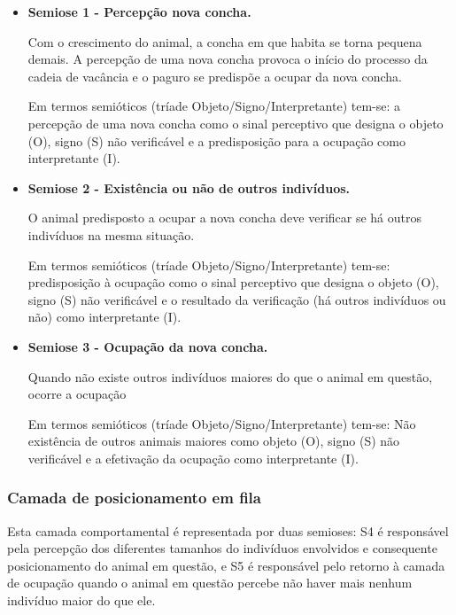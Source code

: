 \begin{itemize}
	\item \textbf{Semiose 1 - Percepção nova concha.}

	Com o crescimento do animal, a concha em que habita se torna pequena demais. A percepção de uma nova concha provoca o início do processo da cadeia de vacância e o paguro se predispõe a ocupar da nova concha.

	Em termos semióticos (tríade Objeto/Signo/Interpretante) tem-se: a percepção de uma nova concha como o sinal perceptivo que designa o objeto (O), signo (S) não verificável e a predisposição para a ocupação como interpretante (I).


	\item \textbf{Semiose 2 - Existência ou não de outros indivíduos.}

	O animal predisposto a ocupar a nova concha deve verificar se há outros indivíduos na mesma situação.

	Em termos semióticos (tríade Objeto/Signo/Interpretante) tem-se: predisposição à ocupação como o sinal perceptivo que designa o objeto (O), signo (S) não verificável e o resultado da verificação (há outros indivíduos ou não) como interpretante (I).


	\item \textbf{Semiose 3 - Ocupação da nova concha.}

	Quando não existe outros indivíduos maiores do que o animal em questão, ocorre a ocupação

	Em termos semióticos (tríade Objeto/Signo/Interpretante) tem-se: Não existência de outros animais maiores como objeto (O), signo (S) não verificável e a efetivação da ocupação como interpretante (I).


\end{itemize}

\subsubsection*{Camada de posicionamento em fila}

Esta camada comportamental é representada por duas semioses: S4 é responsável pela percepção dos diferentes tamanhos do indivíduos envolvidos e consequente posicionamento do animal em questão, e S5 é responsável pelo retorno à camada de ocupação quando o animal em questão percebe não haver mais nenhum indivíduo maior do que ele.

